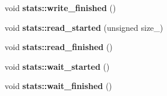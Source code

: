 \begin{CompactItemize}
\item 
\hypertarget{group__iolayer_g5965fa84c7858b4ca62498106ffdb09b}{
void \textbf{stats::write\_\-finished} ()}
\label{group__iolayer_g5965fa84c7858b4ca62498106ffdb09b}

\item 
\hypertarget{group__iolayer_gafaf899b318946ab046da27c93ef49e4}{
void \textbf{stats::read\_\-started} (unsigned size\_\-)}
\label{group__iolayer_gafaf899b318946ab046da27c93ef49e4}

\item 
\hypertarget{group__iolayer_g0c21c9569c80c2708b9930971502ed4f}{
void \textbf{stats::read\_\-finished} ()}
\label{group__iolayer_g0c21c9569c80c2708b9930971502ed4f}

\item 
\hypertarget{group__iolayer_g6fd33395eeac6ec8929b930e4fef328a}{
void \textbf{stats::wait\_\-started} ()}
\label{group__iolayer_g6fd33395eeac6ec8929b930e4fef328a}

\item 
\hypertarget{group__iolayer_g98c7d5499874405c7688519c8d328f93}{
void \textbf{stats::wait\_\-finished} ()}
\label{group__iolayer_g98c7d5499874405c7688519c8d328f93}

\end{CompactItemize}
